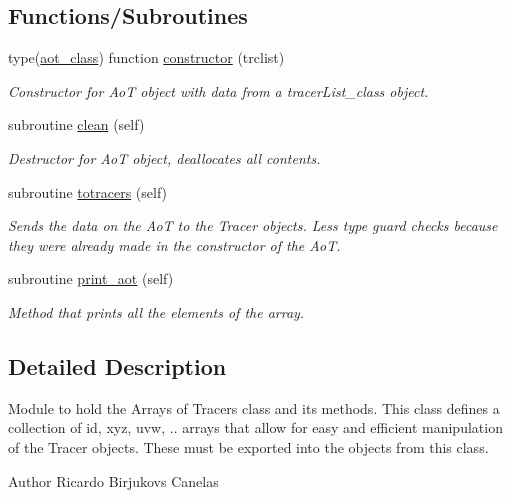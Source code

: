 \subsection*{Functions/\+Subroutines}
\begin{DoxyCompactItemize}
\item 
type(\mbox{\hyperlink{structaot__mod_1_1aot__class}{aot\+\_\+class}}) function \mbox{\hyperlink{namespaceaot__mod_a74ce07a020a7470208360766cfdb12df}{constructor}} (trclist)
\begin{DoxyCompactList}\small\item\em Constructor for AoT object with data from a tracer\+List\+\_\+class object. \end{DoxyCompactList}\item 
subroutine \mbox{\hyperlink{namespaceaot__mod_a054fca942c27758a0ad6afaa68a3a08e}{clean}} (self)
\begin{DoxyCompactList}\small\item\em Destructor for AoT object, deallocates all contents. \end{DoxyCompactList}\item 
subroutine \mbox{\hyperlink{namespaceaot__mod_a73ecd8babd54975720741493be733c48}{totracers}} (self)
\begin{DoxyCompactList}\small\item\em Sends the data on the AoT to the Tracer objects. Less type guard checks because they were already made in the constructor of the AoT. \end{DoxyCompactList}\item 
subroutine \mbox{\hyperlink{namespaceaot__mod_aa6ef0ed7c67e66bf04e7aa0070bbde7f}{print\+\_\+aot}} (self)
\begin{DoxyCompactList}\small\item\em Method that prints all the elements of the array. \end{DoxyCompactList}\end{DoxyCompactItemize}


\subsection{Detailed Description}
Module to hold the Arrays of Tracers class and its methods. This class defines a collection of id, xyz, uvw, .. arrays that allow for easy and efficient manipulation of the Tracer objects. These must be exported into the objects from this class. 

\begin{DoxyAuthor}{Author}
Ricardo Birjukovs Canelas 
\end{DoxyAuthor}



